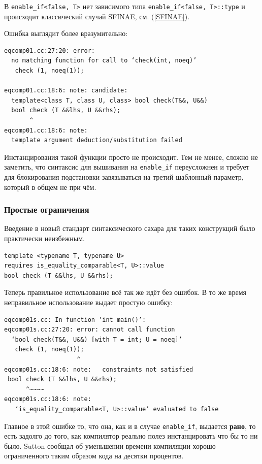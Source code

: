 \documentclass[a4paper,12pt,oneside]{article}
\begin{document}
В \lstinline!enable_if<false, T>! нет зависимого типа \lstinline!enable_if<false, T>::type! и происходит классический случай SFINAE, см. (\ref{SFINAE}).

Ошибка выглядит более вразумительно:

\begin{verbatim}
eqcomp01.cc:27:20: error: 
  no matching function for call to ‘check(int, noeq)’
   check (1, noeq(1));

eqcomp01.cc:18:6: note: candidate: 
  template<class T, class U, class> bool check(T&&, U&&)
  bool check (T &&lhs, U &&rhs);
       ^
eqcomp01.cc:18:6: note:   
  template argument deduction/substitution failed
\end{verbatim}

Инстанцирования такой функции просто не происходит. Тем не менее, сложно не заметить, что синтаксис для вышивания на \lstinline!enable_if! переусложнен и требует для блокирования подстановки завязываться на третий шаблонный параметр, который в общем не при чём.

\subsubsection{Простые ограничения}\label{Constraints}

Введение в новый стандарт синтаксического сахара для таких конструкций было практически неизбежным.

\begin{lstlisting}
template <typename T, typename U>
requires is_equality_comparable<T, U>::value
bool check (T &&lhs, U &&rhs);
\end{lstlisting}

Теперь правильное использование всё так же идёт без ошибок. В то же время неправильное использование выдает простую ошибку:

\begin{verbatim}
eqcomp01s.cc: In function ‘int main()’:
eqcomp01s.cc:27:20: error: cannot call function 
  ‘bool check(T&&, U&&) [with T = int; U = noeq]’
   check (1, noeq(1));
                    ^
eqcomp01s.cc:18:6: note:   constraints not satisfied
 bool check (T &&lhs, U &&rhs);
      ^~~~~
eqcomp01s.cc:18:6: note:   
   ‘is_equality_comparable<T, U>::value’ evaluated to false
\end{verbatim}

Главное в этой ошибке то, что она, как и в случае \lstinline!enable_if!, выдается \textbf{рано}, то есть задолго до того, как компилятор реально полез инстанцировать что бы то ни было. Sutton сообщал об уменьшении времени компиляции хорошо ограниченного таким образом кода на десятки процентов.
\end{document}
